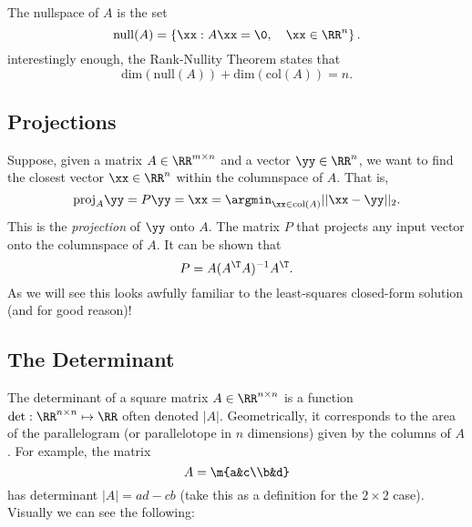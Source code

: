 \documentclass{article}
\begin{document}
The nullspace of $A$ is the set
\[
    \mathrm{null}(A) = \left\{ \xx : A\xx = \0,\quad \xx\in\RR^n \right\}.
\]
interestingly enough, the Rank-Nullity Theorem states that
\[
    \mathrm{dim}(\mathrm{null}(A)) + \mathrm{dim}(\mathrm{col}(A)) = n.
\]

\subsection{Projections}

Suppose, given a matrix $A\in\RR^{m\times n}$ and a vector $\yy\in\RR^n$,
we want to find the closest vector $\xx\in\RR^n$ within the columnspace
of $A$. That is,
\[
    \mathrm{proj}_A \yy = P\yy = \xx = \argmin_{\xx\in\mathrm{col}(A)} ||\xx-\yy||_2.
\]
This is the \textit{projection} of $\yy$ onto $A$. The matrix $P$ that projects
any input vector onto the columnspace of $A$. It can be shown that
\[
    P = A(A^\T A)^{-1}A^\T.
\]
As we will see this looks awfully familiar to the least-squares closed-form
solution (and for good reason)!

\subsection{The Determinant}

The determinant of a square matrix $A\in\RR^{n\times n}$ is a function
$\det: \RR^{n\times n} \mapsto \RR$ often denoted $|A|$. Geometrically,
it corresponds to the area of the parallelogram (or parallelotope in
$n$ dimensions) given by the columns of $A$. For example, the matrix
\[
    A = \m{a&c\\b&d}
\]
has determinant $|A| = ad-cb$ (take this as a definition for the $2\times2$
case). Visually we can see the following:
\begin{center}
\end{center}
\end{document}
